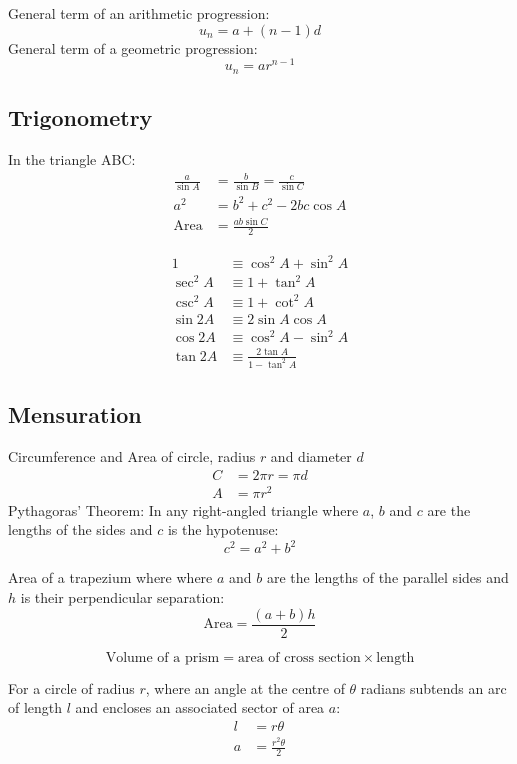 General term of an arithmetic progression: 
\[u_n=a+(n-1)d\]
General term of a geometric progression:
\[u_n=ar^{n-1}\]

\subsection{Trigonometry}
In the triangle ABC:
\begin{align*}
    \frac{a}{\sin A} &= \frac{b}{\sin B} = \frac{c}{\sin C} \\
    a^2 &= b^2 + c^2 -2bc\cos A \\
    \text{Area} &= \frac{ab\sin C}{2}
\end{align*}

\begin{align*}
1 &\equiv \cos^2A+\sin^2A \\
\sec^2A&\equiv 1+\tan^2A\\
\csc^2A&\equiv 1+\cot^2A\\
\sin 2A &\equiv 2\sin A \cos A \\
\cos 2A &\equiv \cos^2A-\sin^2A \\
\tan 2A &\equiv \frac{2\tan A}{1-\tan^2A}
\end{align*}

\subsection{Mensuration}

Circumference and Area of circle, radius \(r\) and diameter \(d\)
\begin{align*} 
C&=2\pi r = \pi d \\
A&=\pi r^2 
\end{align*}
Pythagoras’ Theorem: In any right-angled triangle where \(a\), 
\(b\) and \(c\) are the lengths of the sides and \(c\) is the hypotenuse:
\[c^2=a^2+b^2\]

\noindent
Area of a trapezium where where \(a\) and \(b\) are the lengths of the parallel
sides and \(h\) is their perpendicular separation:
\[\text{Area}=\frac{(a+b)h}{2}\]
\par

\[
    \text{Volume of a prism} = \text{area of cross section} \times
    \text{length}
\]

\noindent
For a circle of radius \(r\), where an angle at the centre of \(\theta\) radians
subtends an arc of length \(l\) and encloses an associated sector of area \(a\):
\begin{align*}
l&=r\theta\\
a&=\frac{r^2\theta}{2}
\end{align*}
